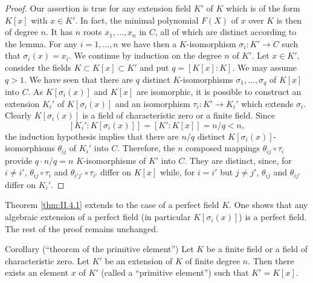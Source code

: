 \begin{proof}
Our assertion is true for any extension field $K'$ of $K$ which is of the
form $K[x]$ with $x\in K'$. In fact, the minimal polynomial $F(X)$ of $x$
over $K$ is then of degree $n$. It has $n$ roots $x_{1},\ldots,x_{n}$ in
$C$, all of which are distinct according to the lemma. For any
$i=1,\ldots,n$ we have then a $K$-isomorphism $\sigma_{i}:K'\to C$ such that
$\sigma_{i}(x)=x_{i}$. We continue by induction on the degree $n$ of $K'$.
Let $x\in K'$, consider the fields $K\subset K[x]\subset K'$ and put
$q=[K[x]:K]$. We may assume $q>1$. We have seen that there are $q$ distinct
$K$-isomorphisms $\sigma_{1},\ldots,\sigma_{q}$ of $K[x]$ into $C$. As
$K[\sigma_{i}(x)]$ and $K[x]$ are isomorphic, it is possible to construct an
extension $K_{i}'$ of $K[\sigma_{i}(x)]$ and an isomorphism
$\tau_{i}:K'\to K_{i}'$ which extends $\sigma_{i}$. Clearly
$K[\sigma_{i}(x)]$ is a field of characteristic zero or a finite field. Since
\[
[K_{i}':K[\sigma_{i}(x)]]=[K':K[x]]=n/q<n,
\]
the induction hypothesis implies that there are $n/q$ distinct
$K[\sigma_{i}(x)]$-isomorphisms $\theta_{ij}$ of $K_{i}'$ into $C$.
Therefore, the $n$ composed mappings $\theta_{ij}\circ\tau_{i}$ provide
$q\cdot n/q=n$ $K$-isomorphisms of $K'$ into $C$. They are distinct, since,
for $i\neq i'$, $\theta_{ij}\circ\tau_{i}$ and $\theta_{i'j'}\circ\tau_{i'}$
differ on $K[x]$ while, for $i=i'$ but $j\neq j'$, $\theta_{ij}$ and
$\theta_{ij'}$ differ on $K_{i}'$.
\end{proof}

Theorem \ref{thm:II.4.1} extends to the case of a perfect field $K$. One
shows that any algebraic extension of a perfect field (in particular
$K[\sigma_{i}(x)]$) is a perfect field. The rest of the proof remains
unchanged.

\begin{statement}{Corollary (``theorem of the primitive element'')}
Let $K$ be a finite field or a field of characteristic zero. Let $K'$ be an
extension of $K$ of finite degree $n$. Then there exists an element $x$ of
$K'$ (called a ``primitive element'') such that $K'=K[x]$.
\end{statement}

